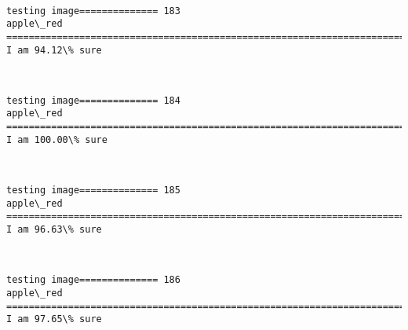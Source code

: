 \documentclass[11pt]{article}
\begin{document}
    \begin{center}
    \end{center}
    { \hspace*{\fill} \\}
    
    \begin{Verbatim}[commandchars=\\\{\}]
testing image============== 183
apple\_red
============================================================================
I am 94.12\% sure

    \end{Verbatim}

    \begin{center}
    \end{center}
    { \hspace*{\fill} \\}
    
    \begin{Verbatim}[commandchars=\\\{\}]
testing image============== 184
apple\_red
============================================================================
I am 100.00\% sure

    \end{Verbatim}

    \begin{center}
    \end{center}
    { \hspace*{\fill} \\}
    
    \begin{Verbatim}[commandchars=\\\{\}]
testing image============== 185
apple\_red
============================================================================
I am 96.63\% sure

    \end{Verbatim}

    \begin{center}
    \end{center}
    { \hspace*{\fill} \\}
    
    \begin{Verbatim}[commandchars=\\\{\}]
testing image============== 186
apple\_red
============================================================================
I am 97.65\% sure

    \end{Verbatim}
\end{document}
